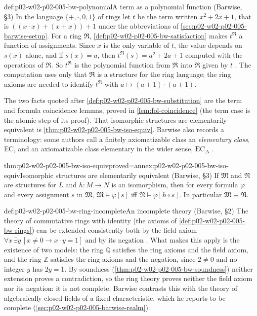 \begin{hbexample}{def:p02-w02-p02-005-bw-polynomial}{A term as a polynomial function (Barwise, \S3)}
In the language \(\{+,\cdot,0,1\}\) of rings let \(t\) be the term written
\(x^2+2x+1\), that is \(((x\cdot x)+(x+x))+1\) under the abbreviations of
\cref{sec:p02-w02-p02-005-barwise-setup}.  For a ring \(\mathfrak R\),
\cref{def:p02-w02-p02-005-bw-satisfaction} makes \(t^{\mathfrak R}\) a
function of assignments.  Since \(x\) is the only variable of \(t\), the
value depends on \(s(x)\) alone, and if \(s(x)=a\), then
\(t^{\mathfrak R}(s)=a^2+2a+1\) computed with the operations of
\(\mathfrak R\).  So \(t^{\mathfrak R}\) is the polynomial function from
\(\mathfrak R\) into \(\mathfrak R\) given by \(t\)
\cite[ch.~A.1, \S3, p.~21]{Barwise1977FirstOrder}.  The computation uses
only that \(\mathfrak R\) is a structure for the ring language; the ring
axioms are needed to identify \(t^{\mathfrak R}\) with
\(a\mapsto(a+1)\cdot(a+1)\).
\end{hbexample}

The two facts quoted after \cref{def:p02-w02-p02-005-bw-substitution} are
the term and formula coincidence lemmas, proved in
\cref{lem:fol-coincidence} (the term case is the atomic step of its
proof).  That isomorphic structures are elementarily equivalent is
\cref{thm:p02-w02-p02-005-bw-iso-equiv}.  Barwise also records a
terminology: some authors call a finitely axiomatizable class an
\emph{elementary class}, EC, and an axiomatizable class elementary in the
wider sense, \(\mathrm{EC}_\Delta\) \cite[ch.~A.1, \S3, p.~22]{Barwise1977FirstOrder}.

\begin{hbtheorem}{thm:p02-w02-p02-005-bw-iso-equiv}{proved=annex:p02-w02-p02-005-bw-iso-equiv}{Isomorphic structures are elementarily equivalent (Barwise, \S3)}
If \(\mathfrak M\) and \(\mathfrak N\) are structures for \(L\) and
\(h:M\to N\) is an isomorphism, then for every formula \(\varphi\) and every
assignment \(s\) in \(\mathfrak M\),
\(\mathfrak M\models\varphi[s]\) iff \(\mathfrak N\models\varphi[h\circ s]\).
In particular \(\mathfrak M\equiv\mathfrak N\).
\end{hbtheorem}

\begin{hbexample}{def:p02-w02-p02-005-bw-ring-incomplete}{An incomplete theory (Barwise, \S2)}
The theory of commutative rings with identity (the axioms of
\cref{def:p02-w02-p02-005-bw-rings}) can be extended consistently both by
the field axiom \(\forall x\,\exists y\,[x\neq0\to x\cdot y=1]\) and by its
negation \cite[ch.~A.1, \S2, p.~16]{Barwise1977FirstOrder}.  What makes
this apply is the existence of two models: the ring \(\mathbb Q\)
satisfies the ring axioms and the field axiom, and the ring \(\mathbb Z\)
satisfies the ring axioms and the negation, since \(2\neq0\) and no
integer \(y\) has \(2y=1\).  By soundness
(\cref{thm:p02-w02-p02-005-bw-soundness}) neither extension proves a
contradiction, so the ring theory proves neither the field axiom nor its
negation: it is not complete.  Barwise contrasts this with the theory of
algebraically closed fields of a fixed characteristic, which he reports to
be complete (\cref{sec:p02-w02-p02-005-barwise-realm}).
\end{hbexample}

